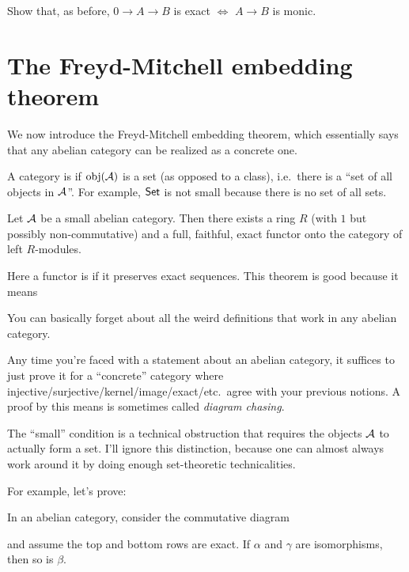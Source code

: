 \begin{exercise}
	Show that, as before, $0 \to A \to B$ is exact $\iff$ $A \to B$ is monic.
\end{exercise}

\section{The Freyd-Mitchell embedding theorem}
We now introduce the Freyd-Mitchell embedding theorem,
which essentially says that any abelian category can be realized as a concrete one.

\begin{definition}
	A category is  if $\obj(\AA)$ is a set (as opposed to a class),
	i.e.\ there is a ``set of all objects in $\AA$''.
	For example, $\catname{Set}$ is not small because there is no set of all sets.
\end{definition}

\begin{theorem}
	Let $\AA$ be a small abelian category.
	Then there exists a ring $R$ (with $1$ but possibly non-commutative)
	and a full, faithful, exact functor onto the category of left $R$-modules.
\end{theorem}
Here a functor is  if it preserves exact sequences.
This theorem is good because it means
\begin{moral}
	You can basically forget about all the weird definitions
	that work in any abelian category.
\end{moral}
Any time you're faced with a statement about an abelian category,
it suffices to just prove it for a ``concrete'' category
where injective/surjective/kernel/image/exact/etc.\
agree with your previous notions.
A proof by this means is sometimes called \emph{diagram chasing}.

\begin{remark}
	The ``small'' condition is a technical obstruction
	that requires the objects $\AA$ to actually form a set.
	I'll ignore this distinction,
	because one can almost always work around it
	by doing enough set-theoretic technicalities.
\end{remark}

For example, let's prove:
\begin{lemma}
	In an abelian category, consider the commutative diagram
	\begin{center}
	\end{center}
	and assume the top and bottom rows are exact.
	If $\alpha$ and $\gamma$ are isomorphisms, then so is $\beta$.
\end{lemma}

